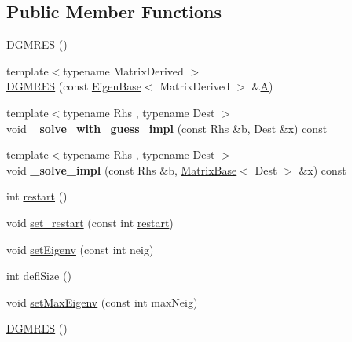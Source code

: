 \subsection*{Public Member Functions}
\begin{DoxyCompactItemize}
\item 
\hyperlink{class_eigen_1_1_d_g_m_r_e_s_a17bd25826b56c39bc7cc4ce8fbf8a848}{D\+G\+M\+R\+ES} ()
\item 
{\footnotesize template$<$typename Matrix\+Derived $>$ }\\\hyperlink{class_eigen_1_1_d_g_m_r_e_s_a800fcf37c0ac66f76d5c070e4aeae2a7}{D\+G\+M\+R\+ES} (const \hyperlink{group___core___module_struct_eigen_1_1_eigen_base}{Eigen\+Base}$<$ Matrix\+Derived $>$ \&\hyperlink{group___core___module_class_eigen_1_1_matrix}{A})
\item 
\mbox{\label{class_eigen_1_1_d_g_m_r_e_s_aa339fee66d9861ae803bdc898ddf6a34}} 
{\footnotesize template$<$typename Rhs , typename Dest $>$ }\\void {\bfseries \+\_\+solve\+\_\+with\+\_\+guess\+\_\+impl} (const Rhs \&b, Dest \&x) const
\item 
\mbox{\label{class_eigen_1_1_d_g_m_r_e_s_ab8325945ebdbd9d75cc796b6cde5a96e}} 
{\footnotesize template$<$typename Rhs , typename Dest $>$ }\\void {\bfseries \+\_\+solve\+\_\+impl} (const Rhs \&b, \hyperlink{group___core___module_class_eigen_1_1_matrix_base}{Matrix\+Base}$<$ Dest $>$ \&x) const
\item 
int \hyperlink{class_eigen_1_1_d_g_m_r_e_s_a8017848f8ea8abc26f9524a05c0d2476}{restart} ()
\item 
void \hyperlink{class_eigen_1_1_d_g_m_r_e_s_a2f99e7b3b04da0ecb6607630a82b4e56}{set\+\_\+restart} (const int \hyperlink{class_eigen_1_1_d_g_m_r_e_s_a8017848f8ea8abc26f9524a05c0d2476}{restart})
\item 
void \hyperlink{class_eigen_1_1_d_g_m_r_e_s_a7510f3ded5959a8d98c3cd3aabebc84b}{set\+Eigenv} (const int neig)
\item 
int \hyperlink{class_eigen_1_1_d_g_m_r_e_s_a724f0f2f124376c3694fd69c59a88d5a}{defl\+Size} ()
\item 
void \hyperlink{class_eigen_1_1_d_g_m_r_e_s_ada9f5fbba382ae941f207322a8b84a01}{set\+Max\+Eigenv} (const int max\+Neig)
\item 
\hyperlink{class_eigen_1_1_d_g_m_r_e_s_a17bd25826b56c39bc7cc4ce8fbf8a848}{D\+G\+M\+R\+ES} ()

\end{DoxyCompactItemize}
